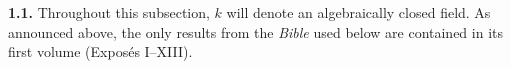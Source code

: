 
\noindent{}\textbf{1.1.}\quad
Throughout this subsection, \(k\) will denote an algebraically closed field.
As announced above, the only results from the \emph{Bible} used below are
contained in its first volume (Exposés I--XIII).
